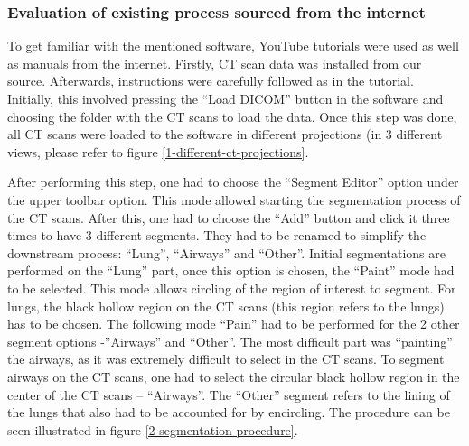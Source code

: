 \documentclass[MME,Projekt,english]{twbook}%
\begin{document}
\subsubsection{Evaluation of existing process sourced from the internet}

To get familiar with the mentioned software, YouTube tutorials \cite{yt-tutorials} were used as well as manuals from the internet. Firstly, CT scan data was installed from our source. Afterwards, instructions were carefully followed as in the tutorial. Initially, this involved pressing the “Load DICOM” button in the software and choosing the folder with the CT scans to load the data. Once this step was done, all CT scans were loaded to the software in different projections (in 3 different views, please refer to figure \ref{1-different-ct-projections}.


After performing this step, one had to choose the “Segment Editor” option under the upper toolbar option. This mode allowed starting the segmentation process of the CT scans. After this, one had to choose the “Add” button and click it three times to have 3 different segments. They had to be renamed to simplify the downstream process: “Lung”, “Airways” and “Other”. Initial segmentations are performed on the “Lung” part, once this option is chosen, the “Paint” mode had to be selected. This mode allows circling of the region of interest to segment. For lungs, the black hollow region on the CT scans (this region refers to the lungs) has to be chosen. The following mode “Pain” had to be performed for the 2 other segment options -”Airways” and “Other”. The most difficult part was “painting” the airways, as it was extremely difficult to select in the CT scans. To segment airways on the CT scans, one had to select the circular black hollow region in the center of the CT scans – “Airways”. The “Other” segment refers to the lining of the lungs that also had to be accounted for by encircling. The procedure can be seen illustrated in figure \ref{2-segmentation-procedure}. 
\end{document}
